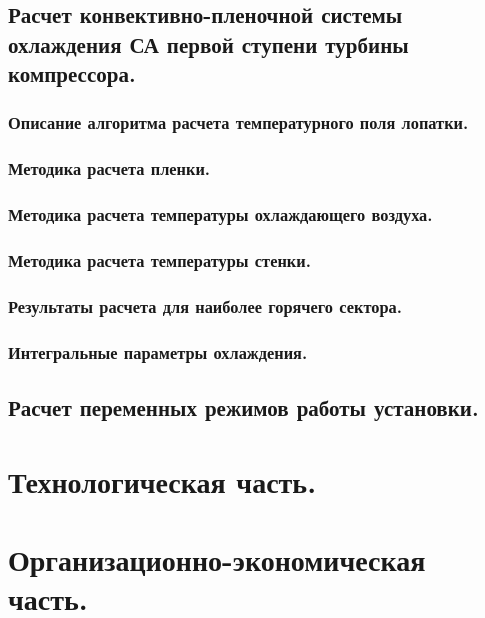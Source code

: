 \documentclass[a4paper,12pt]{article}
\begin{document}
    \subsection{Расчет конвективно-пленочной системы охлаждения СА первой ступени турбины компрессора.}
    \subsubsection{Описание алгоритма расчета температурного поля лопатки.}
    \subsubsection{Методика расчета пленки.}
    \subsubsection{Методика расчета температуры охлаждающего воздуха.}
    \subsubsection{Методика расчета температуры стенки.}
    \subsubsection{Результаты расчета для наиболее горячего сектора.}
    \subsubsection{Интегральные параметры охлаждения.}


    \subsection{Расчет переменных режимов работы установки.}

    \section{Технологическая часть.}
    \section{Организационно-экономическая часть.}
\end{document}
